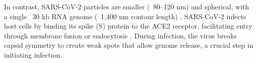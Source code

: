 \documentclass[12pt]{article}
\begin{document}
\begin{flushleft}

In contrast, SARS-CoV-2 particles are smaller (~80–120 nm) and spherical, with a single ~30 kb RNA genome (~1,400 nm contour length) \cite{baron2020sars}\cite{Wu2022}. SARS-CoV-2 infects host cells by binding its spike (S) protein to the ACE2 receptor, facilitating entry through membrane fusion or endocytosis \cite{Barrow2013}\cite{payne2022viruses}. During infection, the virus breaks capsid symmetry to create weak spots that allow genome release, a crucial step in initiating infection.


\end{flushleft}
\end{document}
